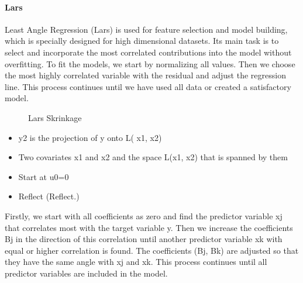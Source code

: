 \paragraph{Lars}

Least Angle Regression (Lars) is used for feature selection and model building, which is specially designed for high dimensional datasets. Its main task is to select and incorporate the most correlated contributions into the model without overfitting. To fit the models, we start by normalizing all values. Then we choose the most highly correlated variable with the residual and adjust the regression line. This process continues until we have used all data or created a satisfactory model. 


\begin{figure}[h]
\centering
\caption{Lars Skrinkage} \label{fig:result-checkpoint-micro}
\end{figure}

\begin{itemize}
    \item y2 is the projection of  y onto L( x1, x2) 
    \item Two covariates x1 and x2 and the space L(x1, x2) that is spanned by them 
    \item Start at u0=0
    \item Reflect (Reflect.)
\end{itemize}
Firstly, we start with all coefficients as zero and find the predictor variable xj that correlates most with the target variable y. Then we increase the coefficients Bj in the direction of this correlation until another predictor variable xk with equal or higher correlation is found. The coefficients (Bj, Bk) are adjusted so that they have the same angle with xj and xk. This process continues until all predictor variables are included in the model. 

